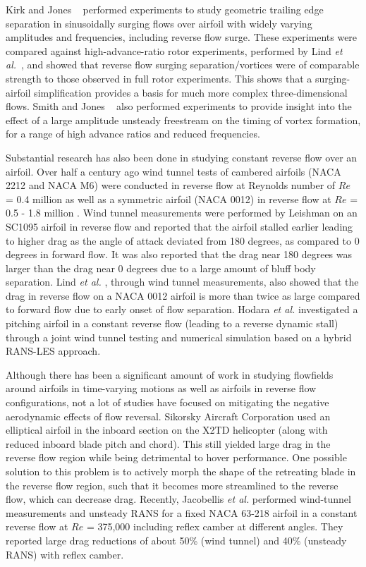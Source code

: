 Kirk and Jones ~\cite{bib:kirk_jones_2019} performed experiments to study geometric trailing edge separation in sinusoidally surging flows over airfoil with widely varying amplitudes and frequencies, including reverse flow surge. These experiments were compared against high-advance-ratio rotor experiments, performed by 
Lind \textit{et al.}~\cite{bib:Lind2018}, and showed that reverse flow surging separation/vortices were of comparable strength to those observed in full rotor experiments. This shows that a surging-airfoil simplification provides a basis for much more complex three-dimensional flows.
Smith and Jones ~\cite{bib:smith2020} also performed experiments to provide insight into the effect of a large amplitude unsteady freestream on the timing of vortex formation, for a range of high advance ratios and reduced frequencies. 

Substantial research has also been done in studying constant reverse flow over an airfoil. 
Over half a century ago wind tunnel tests of
cambered airfoils (NACA 2212 and NACA M6) were conducted in reverse
flow at Reynolds number of $Re$ = 0.4 million \cite{bib:naumann1942}  as well as a symmetric airfoil (NACA 0012) in reverse flow at $Re$ = 0.5 - 1.8 million
\cite{bib:critzos1955}.
Wind tunnel measurements were performed by Leishman  on an
SC1095 airfoil in reverse flow \cite{bib:leishman1993} and reported that the airfoil stalled earlier leading to higher drag
as the angle of attack deviated from 180 degrees, as compared to 0 degrees in forward flow. 
It was also reported
that the drag near 180 degrees was larger than the drag near 0 degrees due to a large amount of bluff body separation.
Lind \textit{et al.} \cite{bib:lind2013, bib:lind2014}, through wind tunnel measurements, also showed that the drag in reverse flow on a NACA 0012 airfoil is more than twice as large compared to forward flow
due to early onset of flow separation. 
Hodara \textit{et al.} \cite{bib:hodara2016} investigated a pitching airfoil in a constant reverse flow (leading to a reverse dynamic stall) through a joint wind tunnel testing and numerical simulation based on a hybrid RANS-LES approach.

Although there has been a significant amount of work in studying flowfields around airfoils in time-varying motions as well as airfoils in reverse flow configurations, not a lot of studies have focused on mitigating the negative aerodynamic effects of flow reversal. Sikorsky Aircraft Corporation used an elliptical airfoil in the
inboard section on the X2TD helicopter \cite{bib:bagai2008} (along with reduced inboard blade pitch
and chord). This still yielded large drag in the reverse flow region while being detrimental to hover performance. 
One possible solution to this problem is to actively morph the shape of the retreating blade in the reverse flow region, such that it becomes more streamlined to the reverse flow, which can decrease drag. 
Recently, Jacobellis \textit{et al.} \cite{bib:jacobellis2018} performed wind-tunnel measurements and unsteady RANS for a fixed NACA 63-218 airfoil
in a constant reverse flow at $Re$ = 375,000 including reflex camber at different angles.
They reported large drag reductions of about 50\% (wind tunnel) and 40\% (unsteady RANS) with reflex camber.

